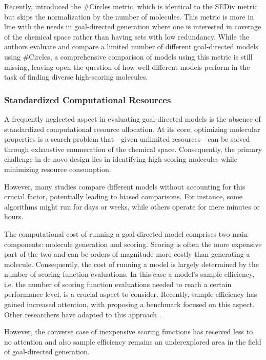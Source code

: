 Recently, \citet{xieHowMuchSpace2023} introduced the \#Circles metric, which is identical to the
SEDiv metric but skips the normalization by the number of molecules. This metric is more in line
with the needs in goal-directed generation where one is interested in coverage of the chemical space
rather than having sets with low redundancy. While the authors evaluate and compare a limited number
of different goal-directed models using \#Circles, a comprehensive comparison of models using this
metric is still missing, leaving open the question of how well different models perform in the task
of finding diverse high-scoring molecules.

\subsubsection{Standardized Computational Resources}
A frequently neglected aspect in evaluating goal-directed models is the absence of standardized
computational resource allocation. At its core, optimizing molecular properties is a search problem
that—given unlimited resources—can be solved through exhaustive enumeration of the chemical space.
Consequently, the primary challenge in de novo design lies in identifying high-scoring molecules
while minimizing resource consumption.

However, many studies compare different models without
accounting for this crucial factor, potentially leading to biased comparisons. For instance, some
algorithms might run for days or weeks, while others operate for mere minutes or hours.

The computational cost of running a goal-directed model comprises two main components: molecule
generation and scoring. Scoring is often the more expensive part of the two and can be orders of
magnitude more costly than generating a molecule. Consequently, the cost of running a model is
largely determined by the number of scoring function evaluations. In this case a model's sample efficiency,
i.e. the number of scoring function evaluations needed to reach a certain performance level,
is a crucial aspect to consider. Recently, sample efficiency has gained increased attention,
with \citep{gaoSampleEfficiencyMatters2022} proposing a benchmark focused on this aspect. Other
researchers have adapted to this approach
\citep{thomasReevaluatingSampleEfficiency2022,thomasAugmentedHillClimbIncreases2022,guoAugmentedMemoryCapitalizing2023}.

However, the converse case of inexpensive scoring functions has received less to no attention and
also sample efficiency remains an underexplored area in the field of goal-directed generation.

